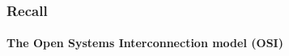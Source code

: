 \begin{frame}		
	
	\frametitle{Recall}
	\framesubtitle{The Open Systems Interconnection model (OSI)}
	
	\begin{columns}
	\begin{column}{0.5\textwidth}
		\begin{figure}[H]
		\end{figure}
		\centering
	\end{column}
	\begin{column}{0.5\textwidth}  %
		\begin{center}
			\begin{figure}[H]
			\end{figure}
		\end{center}
		\centering 
	\end{column}
\end{columns}
	
	
\end{frame}